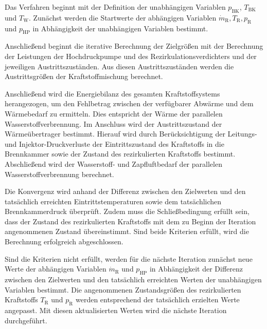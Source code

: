 Das Verfahren beginnt mit der Definition der unabhängigen Variablen $p_\mathrm{BK}$, $T_\mathrm{BK}$ und $T_\mathrm{W}$. Zunächst werden die Startwerte der abhängigen Variablen $\dot{m}_\mathrm{R}, T_\mathrm{R}, p_\mathrm{R}$ und $p_\mathrm{HP}$ in Abhängigkeit der unabhängigen Variablen bestimmt. 

Anschließend beginnt die iterative Berechnung der Zielgrößen mit der Berechnung der Leistungen der Hochdruckpumpe und des Rezirkulationsverdichters und der jeweiligen Austrittszuständen. Aus diesen Austrittszuständen werden die Austrittsgrößen der Kraftstoffmischung berechnet. 

Anschließend wird die Energiebilanz des gesamten Kraftstoffsystems herangezogen, um den Fehlbetrag zwischen der verfügbarer Abwärme und dem Wärmebedarf zu ermitteln. Dies entspricht der Wärme der parallelen Wasserstoffverbrennung. Im Anschluss wird der Austrittszustand der Wärmeübertrager bestimmt. Hierauf wird durch Berücksichtigung der Leitungs- und Injektor-Druckverluste der Eintrittszustand des Kraftstoffs in die Brennkammer sowie der Zustand des rezirkulierten Kraftstoffs bestimmt. Abschließend wird der Wasserstoff- und Zapfluftbedarf der parallelen Wasserstoffverbrennung berechnet. 

Die Konvergenz wird anhand der Differenz zwischen den Zielwerten und den tatsächlich erreichten Eintrittstemperaturen sowie dem tatsächlichen Brennkammerdruck überprüft. Zudem muss die Schließbedingung erfüllt sein, dass der Zustand des rezirkulierten Kraftstoffs mit dem zu Beginn der Iteration angenommenen Zustand übereinstimmt. Sind beide Kriterien erfüllt, wird die Berechnung erfolgreich abgeschlossen.

Sind die Kriterien nicht erfüllt, werden für die nächste Iteration zunächst neue Werte der abhängigen Variablen $\dot{m}_\mathrm{R}$ und $p_\mathrm{HP}$ in Abhängigkeit der Differenz zwischen den Zielwerten und den tatsächlich erreichten Werten der unabhängigen Variablen bestimmt. Die angenommenen Zustandsgrößen des rezirkulierten Kraftstoffs $T_\mathrm{R}$ und $p_\mathrm{R}$ werden entsprechend der tatsächlich erzielten Werte angepasst. Mit diesen aktualisierten Werten wird die nächste Iteration durchgeführt.


